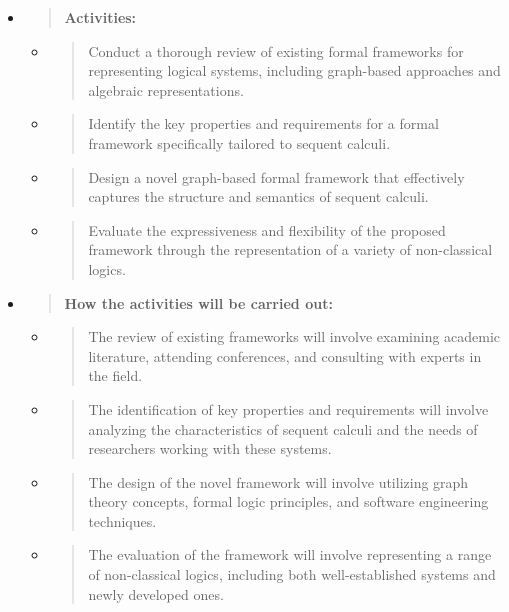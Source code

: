 \begin{itemize}
\item
  \begin{quote}
  \textbf{Activities:}
  \end{quote}

  \begin{itemize}
  \item
    \begin{quote}
    Conduct a thorough review of existing formal frameworks for
    representing logical systems, including graph-based approaches and
    algebraic representations.
    \end{quote}
  \item
    \begin{quote}
    Identify the key properties and requirements for a formal framework
    specifically tailored to sequent calculi.
    \end{quote}
  \item
    \begin{quote}
    Design a novel graph-based formal framework that effectively
    captures the structure and semantics of sequent calculi.
    \end{quote}
  \item
    \begin{quote}
    Evaluate the expressiveness and flexibility of the proposed
    framework through the representation of a variety of non-classical
    logics.
    \end{quote}
  \end{itemize}
\item
  \begin{quote}
  \textbf{How the activities will be carried out:}
  \end{quote}

  \begin{itemize}
  \item
    \begin{quote}
    The review of existing frameworks will involve examining academic
    literature, attending conferences, and consulting with experts in
    the field.
    \end{quote}
  \item
    \begin{quote}
    The identification of key properties and requirements will involve
    analyzing the characteristics of sequent calculi and the needs of
    researchers working with these systems.
    \end{quote}
  \item
    \begin{quote}
    The design of the novel framework will involve utilizing graph
    theory concepts, formal logic principles, and software engineering
    techniques.
    \end{quote}
  \item
    \begin{quote}
    The evaluation of the framework will involve representing a range of
    non-classical logics, including both well-established systems and
    newly developed ones.
    \end{quote}
  \end{itemize}
\end{itemize}

